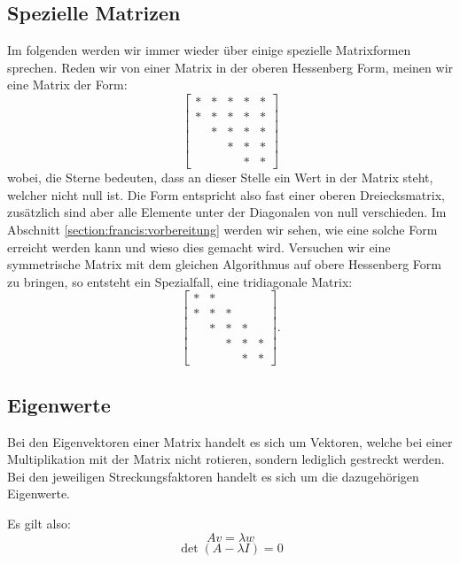 \subsection{Spezielle Matrizen\label{francis:section:grundlagen:spezielle_matrizen}}
Im folgenden werden wir immer wieder über einige spezielle Matrixformen sprechen.
Reden wir von einer Matrix in der oberen Hessenberg Form, meinen wir eine Matrix der Form:
\begin{equation}
	\begin{bmatrix}
	* & * & * & * & * \\
	* & * & * & * & * \\
	& * & * & * & * \\
	&   & * & * & * \\
	&   &   & * & *
	\end{bmatrix}
\end{equation}
wobei, die Sterne bedeuten, dass an dieser Stelle ein Wert in der Matrix steht, welcher nicht null ist.
Die Form entspricht also fast einer oberen Dreiecksmatrix, zusätzlich sind aber alle Elemente unter der Diagonalen von null verschieden.
Im Abschnitt \ref{section:francis:vorbereitung} werden wir sehen, wie eine solche Form erreicht werden kann und wieso dies gemacht wird.
Versuchen wir eine symmetrische Matrix mit dem gleichen Algorithmus auf obere Hessenberg Form zu bringen, so entsteht ein Spezialfall, eine tridiagonale Matrix:
\begin{equation}
	\begin{bmatrix}
	* & * &   &   &   \\
	* & * & *  &   &   \\
	& * & * & * &  \\
	&   & * & * & * \\
	&   &   & * & *
	\end{bmatrix}.
\end{equation}

\subsection{Eigenwerte\label{francis:section:grundlagen:eigenwerte}}
Bei den Eigenvektoren einer Matrix handelt es sich um Vektoren, welche bei einer Multiplikation mit der Matrix nicht rotieren, sondern lediglich gestreckt werden.
Bei den jeweiligen Streckungsfaktoren handelt es sich um die dazugehörigen Eigenwerte.

Es gilt also:
\begin{equation}
	Av=\lambda w
\end{equation}
\begin{equation}
	\det(A-\lambda I) = 0
\end{equation}

